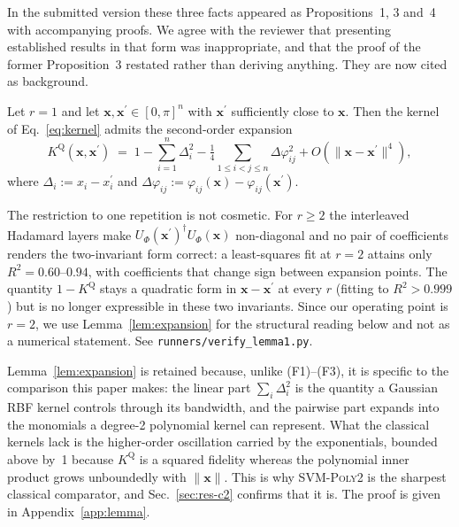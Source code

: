 \begin{remark}
In the submitted version these three facts appeared as Propositions~1, 3 and~4
with accompanying proofs. We agree with the reviewer that presenting established
results in that form was inappropriate, and that the proof of the former
Proposition~3 restated \cite{cortes2012} rather than deriving anything. They are
now cited as background.
\end{remark}

\begin{lemma}[Local expansion of the \ZZ{} kernel at $r=1$]
\label{lem:expansion}
Let $r=1$ and let $\bm{x},\bm{x}^{\prime}\in[0,\pi]^n$ with $\bm{x}^{\prime}$
sufficiently close to $\bm{x}$. Then the kernel of Eq.~\eqref{eq:kernel} admits
the second-order expansion
\begin{equation}
\label{eq:expansion}
  K^{\mathrm{Q}}(\bm{x},\bm{x}^{\prime}) \;=\; 1
  - \sum_{i=1}^{n}\Delta_i^2
  - \tfrac{1}{4}\!\!\sum_{1\le i<j\le n}\!\!\Delta\varphi_{ij}^2
  + O(\|\bm{x}-\bm{x}^{\prime}\|^4),
\end{equation}
where $\Delta_i := x_i - x_i^{\prime}$ and
$\Delta\varphi_{ij} := \varphi_{ij}(\bm{x}) - \varphi_{ij}(\bm{x}^{\prime})$.
\end{lemma}

\begin{remark}
\label{rem:reps}
The restriction to one repetition is not cosmetic. For $r\ge2$ the interleaved
Hadamard layers make $U_{\Phi}(\bm{x}^{\prime})^{\dagger}U_{\Phi}(\bm{x})$
non-diagonal and no pair of coefficients renders the two-invariant form correct:
a least-squares fit at $r=2$ attains only $R^2=0.60$--$0.94$, with coefficients
that change sign between expansion points. The quantity $1-K^{\mathrm{Q}}$
stays a quadratic form in $\bm{x}-\bm{x}^{\prime}$ at every $r$ (fitting to
$R^2>0.999$) but is no longer expressible in these two invariants. Since our
operating point is $r=2$, we use Lemma~\ref{lem:expansion} for the structural
reading below and not as a numerical statement. See
\texttt{runners/verify\_lemma1.py}.
\end{remark}

Lemma~\ref{lem:expansion} is retained because, unlike (F1)--(F3), it is specific
to the comparison this paper makes: the linear part $\sum_i \Delta_i^2$ is the
quantity a Gaussian RBF kernel controls through its bandwidth, and the pairwise
part expands into the monomials a degree-2 polynomial kernel can represent. What
the classical kernels lack is the higher-order oscillation carried by the
exponentials, bounded above by~1 because $K^{\mathrm{Q}}$ is a squared fidelity
whereas the polynomial inner product grows unboundedly with $\|\bm{x}\|$. This is
why SVM-\textsc{Poly2} is the sharpest classical comparator, and
Sec.~\ref{sec:res-c2} confirms that it is. The proof is given in
Appendix~\ref{app:lemma}.

